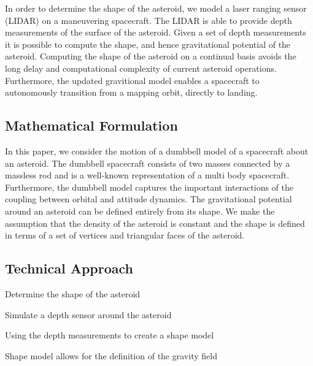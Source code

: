 \documentclass[11pt,reqno,twocolumn]{article} %
\begin{document}
In order to determine the shape of the asteroid, we model a laser ranging sensor (LIDAR) on a maneuvering spacecraft.
The LIDAR is able to provide depth measurements of the surface of the asteroid.
Given a set of depth measurements it is possible to compute the shape, and hence gravitational potential of the asteroid.
Computing the shape of the asteroid on a continual basis avoids the long delay and computational complexity of current asteroid operations.
Furthermore, the updated gravitional model enables a spacecraft to autonomously transition from a mapping orbit, directly to landing.

\subsection*{Mathematical Formulation}\label{se:mathematical_problem}
In this paper, we consider the motion of a dumbbell model of a spacecraft about an asteroid.
The dumbbell spacecraft consists of two masses connected by a massless rod and is a well-known representation of a multi body spacecraft.
Furthermore, the dumbbell model captures the important interactions of the coupling between orbital and attitude dynamics. 
The gravitational potential around an asteroid can be defined entirely from its shape.
We make the assumption that the density of the asteroid is constant and the shape is defined in terms of a set of vertices and triangular faces of the asteroid.


\subsection*{Technical Approach}

Determine the shape of the asteroid

Simulate a depth sensor around the asteroid

Using the depth measurements to create a shape model

Shape model allows for the definition of the gravity field


\end{document}
